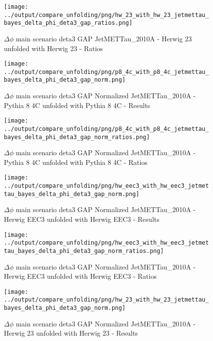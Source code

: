 \documentclass[11pt]{book}
\begin{document}
\begin{figure}[ht]
\centering
\texttt{[image: ../output/compare\_unfolding/png/hw\_23\_with\_hw\_23\_jetmettau\_bayes\_delta\_phi\_deta3\_gap\_ratios.png]}
\caption{$\Delta\phi$ main scenario deta3 GAP JetMETTau\_2010A - Herwig 23 unfolded with Herwig 23 - Ratios}
\label{hw_23_hw_23_jetmettau_bayes_delta_phi_deta3_gap_b}
\end{figure}


\begin{figure}[ht]
\centering
\texttt{[image: ../output/compare\_unfolding/png/p8\_4c\_with\_p8\_4c\_jetmettau\_bayes\_delta\_phi\_deta3\_gap\_norm.png]}
\caption{$\Delta\phi$ main scenario deta3 GAP Normalized JetMETTau\_2010A - Pythia 8 4C unfolded with Pythia 8 4C - Results}
\label{p8_p8_jetmettau_bayes_delta_phi_deta3_gap_norm_a}
\end{figure}

\begin{figure}[ht]
\centering
\texttt{[image: ../output/compare\_unfolding/png/p8\_4c\_with\_p8\_4c\_jetmettau\_bayes\_delta\_phi\_deta3\_gap\_norm\_ratios.png]}
\caption{$\Delta\phi$ main scenario deta3 GAP Normalized JetMETTau\_2010A - Pythia 8 4C unfolded with Pythia 8 4C - Ratios}
\label{p8_p8_jetmettau_bayes_delta_phi_deta3_gap_norm_b}
\end{figure}

\begin{figure}[ht]
\centering
\texttt{[image: ../output/compare\_unfolding/png/hw\_eec3\_with\_hw\_eec3\_jetmettau\_bayes\_delta\_phi\_deta3\_gap\_norm.png]}
\caption{$\Delta\phi$ main scenario deta3 GAP Normalized JetMETTau\_2010A - Herwig EEC3 unfolded with Herwig EEC3 - Results}
\label{hw_eec3_hw_eec3_jetmettau_bayes_delta_phi_deta3_gap_norm_a}
\end{figure}

\begin{figure}[ht]
\centering
\texttt{[image: ../output/compare\_unfolding/png/hw\_eec3\_with\_hw\_eec3\_jetmettau\_bayes\_delta\_phi\_deta3\_gap\_norm\_ratios.png]}
\caption{$\Delta\phi$ main scenario deta3 GAP Normalized JetMETTau\_2010A - Herwig EEC3 unfolded with Herwig EEC3 - Ratios}
\label{hw_eec3_hw_eec3_jetmettau_bayes_delta_phi_deta3_gap_norm_b}
\end{figure}

\begin{figure}[ht]
\centering
\texttt{[image: ../output/compare\_unfolding/png/hw\_23\_with\_hw\_23\_jetmettau\_bayes\_delta\_phi\_deta3\_gap\_norm.png]}
\caption{$\Delta\phi$ main scenario deta3 GAP Normalized JetMETTau\_2010A - Herwig 23 unfolded with Herwig 23 - Results}
\label{hw_23_hw_23_jetmettau_bayes_delta_phi_deta3_gap_norm_a}
\end{figure}
\end{document}
